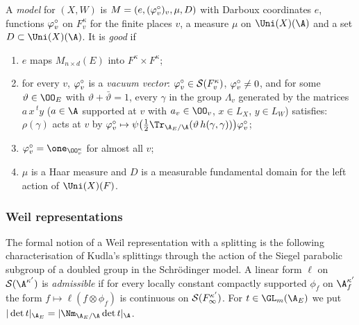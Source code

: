 \begin{definition}\label{pf:tlift:model}
A \emph{model} for $(X,W)$ is $M=(e,(\varphi^{\circ}_v)_v,\mu,D)$ with Darboux coordinates $e$, functions
$\varphi^{\circ}_v$ on $F_v^\kappa$ for the finite places $v$, a measure $\mu$ on $\Uni(X)(\A)$ and a set
$D\subset\Uni(X)(\A)$. It is \emph{good} if
\begin{enumerate}[label=(M\arabic*),nosep]
\item $e$ maps $M_{n\times d}(E)$ into $F^\kappa\times F^\kappa$;
\item for every $v$, $\varphi^{\circ}_v$ is a \emph{vacuum vector}: $\varphi^{\circ}_v\in\mathcal{S}(F_v^\kappa)$, $\varphi^{\circ}_v\ne0$, and
  for some $\vartheta\in\OO_E$ with $\vartheta+\bar\vartheta=1$, every $\gamma$ in the group $\Lambda_v$ generated
  by the matrices $a\,x\,{}^ty$ ($a\in\A$ supported at $v$ with $a_v\in\OO_v$, $x\in L_X$, $y\in L_W$)
  satisfies: $\rho(\gamma)$ acts at $v$ by
  $\tliftvac_v\mapsto\psi\bigl(\tfrac12\Tr_{\tliftAE/\A}(\vartheta\,h(\gamma,\gamma))\bigr)\tliftvac_v$;
\item $\tliftvac_v=\one_{\OO_v^\kappa}$ for almost all $v$;
\item $\mu$ is a Haar measure and $D$ is a measurable fundamental domain for the left action of
  $\Uni(X)(F)$.
\end{enumerate}
\end{definition}

\subsubsection*{Weil representations}
The formal notion of a Weil representation with a splitting is the following characterisation of
Kudla's splittings \cite{Kudla1994,HarrisKudlaSweet1996} through the action of the Siegel parabolic
subgroup of a doubled group in the Schr\"odinger model. A linear form $\ell$ on $\tliftS(\A^{\kappa'})$ is
\emph{admissible} if for every locally constant compactly supported $\phi_f$ on $\A_f^{\kappa'}$ the form
$f\mapsto\ell(f\otimes\phi_f)$ is continuous on $\mathcal{S}(F_\infty^{\kappa'})$. For $t\in\GL_m(\tliftAE)$ we put
$|\det t|_{\tliftAE}=|\Nm_{\tliftAE/\A}\det t|_\A$.

